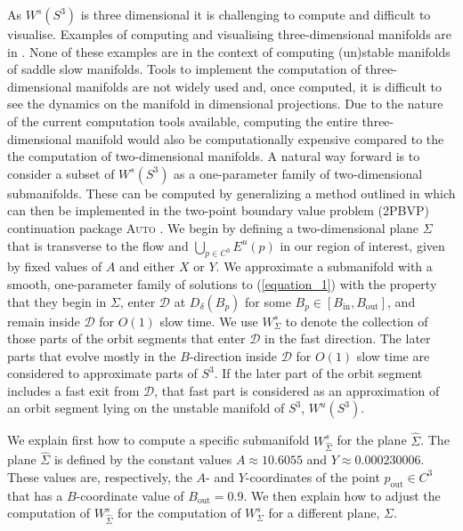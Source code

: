 \documentclass{ws-ijbc}
\begin{document}
As $W^{s}(S^3)$ is three dimensional it is challenging to compute and difficult to visualise.  Examples of computing and visualising three-dimensional manifolds are in \cite{Initial_conditions_volume, Invariant_tori_again, Invariant_tori}.  None of these examples are in the context of computing (un)stable manifolds of saddle slow manifolds.  Tools to implement the computation of three-dimensional manifolds are not widely used and, once computed, it is difficult to see the dynamics on the manifold in  dimensional projections.  Due to the nature of the current computation tools available, computing the entire three-dimensional manifold would also be computationally expensive compared to the the computation of two-dimensional manifolds.  A natural way forward is to consider a subset of $W^{s}(S^3)$ as a one-parameter family of two-dimensional submanifolds.  These can be computed by generalizing a method outlined in \cite{Saeed_Paper} which can then be implemented in the two-point boundary value problem (2PBVP) continuation package \textsc{Auto} \cite{AUTO}.  We begin by defining a two-dimensional plane $\Sigma$  that is transverse to the flow and $\bigcup_{p \in C^3} E^u(p)$ in our region of interest, given by fixed values of $A$ and either $X$ or $Y$.  We approximate a submanifold with a smooth, one-parameter family of solutions to (\ref{equation_1}) with the property that they begin in $\Sigma$, enter $\mathscr{D}$ at $D_{\delta}(B_p)$ for some $B_p \in [B_{\text{in}}, B_{\text{out}}]$, and remain inside $\mathscr{D}$ for $O(1)$ slow time.  We use $W^{s}_{\Sigma}$ to denote the collection of those parts of the orbit segments that enter $\mathscr{D}$ in the fast direction.  The later parts that evolve mostly in the $B$-direction inside $\mathscr{D}$ for $O(1)$ slow time are considered to approximate parts of $S^3$.  If the later part of the orbit segment includes a fast exit from $\mathscr{D}$, that fast part is considered as an approximation of an orbit segment lying on the unstable manifold of $S^3$, $W^{u}(S^3)$.

We explain first how to compute a specific submanifold $W^s_{\widehat{\Sigma}}$ for the plane $\widehat{\Sigma}$.  The plane $\widehat{\Sigma}$ is defined by the constant values $A \approx 10.6055$ and $Y \approx 0.000230006$.  These values are, respectively, the $A$- and $Y$-coordinates of the point $p_{\text{out}} \in C^3$ that has a $B$-coordinate value of $B_{\text{out}}=0.9$.  We then explain how to adjust the computation of $W^{s}_{\widehat{\Sigma}}$ for the computation of $W^{s}_\Sigma$ for a different plane, $\Sigma$.
\end{document}

